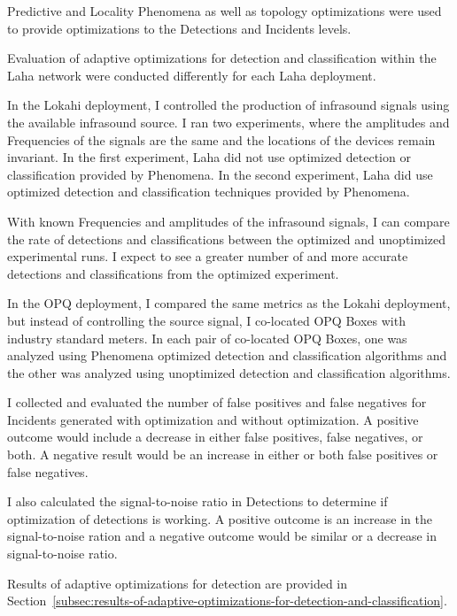 Predictive and Locality Phenomena as well as topology optimizations were used to provide optimizations to the Detections and Incidents levels.

Evaluation of adaptive optimizations for detection and classification within the Laha network were conducted differently for each Laha deployment.

In the Lokahi deployment, I controlled the production of infrasound signals using the available infrasound source. I ran two experiments, where the amplitudes and Frequencies of the signals are the same and the locations of the devices remain invariant. In the first experiment, Laha did not use optimized detection or classification provided by Phenomena. In the second experiment, Laha did use optimized detection and classification techniques provided by Phenomena.

With known Frequencies and amplitudes of the infrasound signals, I can compare the rate of detections and classifications between the optimized and unoptimized experimental runs. I expect to see a greater number of and more accurate detections and classifications from the optimized experiment.

In the OPQ deployment, I compared the same metrics as the Lokahi deployment, but instead of controlling the source signal, I co-located OPQ Boxes with industry standard meters. In each pair of co-located OPQ Boxes, one was analyzed using Phenomena optimized detection and classification algorithms and the other was analyzed using unoptimized detection and classification algorithms.

I collected and evaluated the number of false positives and false negatives for Incidents generated with optimization and without optimization. A positive outcome would include a decrease in either false positives, false negatives, or both. A negative result would be an increase in either or both false positives or false negatives.

I also calculated the signal-to-noise ratio in Detections to determine if optimization of detections is working. A positive outcome is an increase in the signal-to-noise ration and a negative outcome would be similar or a decrease in signal-to-noise ratio.

Results of adaptive optimizations for detection are provided in Section~\ref{subsec:results-of-adaptive-optimizations-for-detection-and-classification}.

